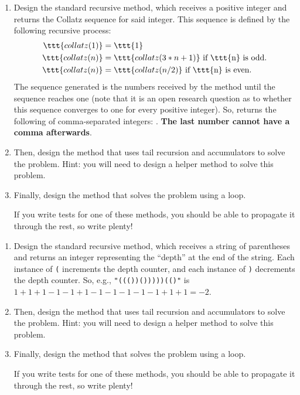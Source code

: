 \begin{enumerate}[label=(\alph*)]
\item Design the standard recursive  method, which receives a positive integer and returns the Collatz sequence for said integer. This sequence is defined by the following recursive process:
\begin{align*}
    \ttt{collatz(1)} &= \ttt{1}\\
    \ttt{collatz(n)} &= \ttt{collatz(3 * n + 1)} \text{ if \ttt{n} is odd.}\\
    \ttt{collatz(n)} &= \ttt{collatz(n / 2)} \text{ if \ttt{n} is even.}
\end{align*}
The sequence generated is the numbers received by the method until the sequence reaches one (note that it is an open research question as to whether this sequence converges to one for every positive integer). So,  returns the following  of comma-separated integers: . \textbf{The last number cannot have a comma afterwards}.

\item Then, design the  method that uses tail recursion and accumulators to solve the problem. Hint: you will need to design a  helper method to solve this problem.

\item Finally, design the  method that solves the problem using a loop.

If you write tests for one of these methods, you should be able to propagate it through the rest, so write plenty!
\end{enumerate}

\begin{enumerate}[label=(\alph*)]
\item Design the standard recursive  method, which receives a string of parentheses and returns an integer representing the ``depth'' at the end of the string. Each instance of \texttt{(} increments the depth counter, and each instance of \texttt{)} decrements the depth counter. So, e.g., \texttt{"((())()))))(()"} is $1+1+1-1-1+1-1-1-1-1-1+1+1=-2$.

\item Then, design the  method that uses tail recursion and accumulators to solve the problem. Hint: you will need to design a  helper method to solve this problem.

\item Finally, design the  method that solves the problem using a loop.

If you write tests for one of these methods, you should be able to propagate it through the rest, so write plenty!
\end{enumerate}

